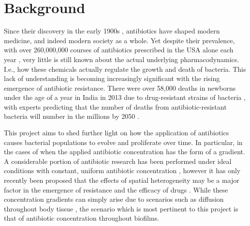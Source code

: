 \documentclass[a4paper,12pt]{article}
\begin{document}
\section{Background}


Since their discovery in the early 1900s \cite{bioref:first-antibiotics}, antibiotics have shaped modern medicine,
and indeed modern society as a whole.  Yet despite their prevalence, with over 260,000,000 courses of antibiotics prescribed 
in the USA alone each year \cite{bioref:antibiotics-usage-USA-2011}, very little is still known about the actual 
underlying pharmacodynamics.  I.e., how these chemicals actually regulate the growth and death of bacteria.  This 
lack of understanding is becoming increasingly significant with the rising emergence of antibiotic resistance.  
There were over 58,000 deaths in newborns under the age of a year in India in 2013 due to drug-resistant 
strains of bacteria \cite{bioref:india-death-stats}, with experts predicting that the number of deaths from 
antibiotic-resistant bacteria will number in the millions by 2050 \cite{bioref:future-death-stats}.

This project aims to shed further light on how the application of antibiotics causes bacterial populations
to evolve and proliferate over time.  In particular, in the cases of when the applied antibiotic concentration has
the form of a gradient.  A considerable portion of antibiotic research has been performed under ideal conditions
with constant, uniform antibiotic concentration \cite{bioref:Grasso-constant-antibtioic-concn}, however it has only 
recently been proposed that the effects of spatial heterogeneity may be a major factor in the emergence of resistance 
and the efficacy of drugs \cite{bioref:Zhang-effects-of-antibio-grad}.  While these concentration gradients can simply arise 
due to scenarios such as diffusion throughout body tissue \cite{bioref:tissue-antibio-grads}, the scenario which is most pertinent
to this project is that of antibiotic concentration throughout biofilms.
\end{document}
